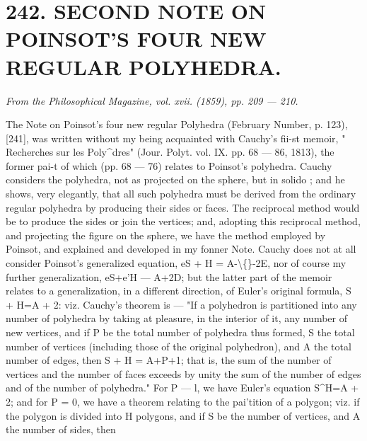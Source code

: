 \documentclass[11pt,a4paper]{book}
\begin{document}
\newpage

\section*{242. SECOND    NOTE    ON    POINSOT'S    FOUR   NEW    REGULAR POLYHEDRA.}
\begin{flushright}
\textit{From  the  Philosophical  Magazine,  vol.  xvii.  (1859),  pp.  209 — 210.}\n\end{flushright}
\vspace{0.5em}
The  Note  on  Poinsot's  four  new  regular  Polyhedra  (February  Number,  p.  123),
[241],  was  written  without  my  being  acquainted  with  Cauchy's  fii-st  memoir,  "  Recherches
sur  les  Poly^dres"  (Jour.  Polyt.  vol.  IX.  pp.  68 — 86,  1813),  the  former  pai-t  of  which
(pp.  68 — 76)  relates  to  Poinsot's  polyhedra.  Cauchy  considers  the  polyhedra,  not  as
projected  on  the  sphere,  but  in  solido ;  and  he  shows,  very  elegantly,  that  all  such
polyhedra  must  be  derived  from  the  ordinary  regular  polyhedra  by  producing  their
sides  or  faces.  The  reciprocal  method  would  be  to  produce  the  sides  or  join  the
vertices;  and,  adopting  this  reciprocal  method,  and  projecting  the  figure  on  the  sphere,
we  have  the  method  employed  by  Poinsot,  and  explained  and  developed  in  my  fonner
Note.  Cauchy  does  not  at  all  consider  Poinsot's  generalized  equation,  eS  +  H  =  A-\textbackslash\{\}-2E,
nor  of  course  my  further  generalization,  eS+e'H  —  A+2D;  but  the  latter  part  of  the
memoir  relates  to  a  generalization,  in  a  different  direction,  of  Euler's  original  formula,
S  +  H=A  +  2:  viz.  Cauchy's  theorem  is — "If  a  polyhedron  is  partitioned  into  any
number  of  polyhedra  by  taking  at  pleasure,  in  the  interior  of  it,  any  number  of  new
vertices,  and  if  P  be  the  total  number  of  polyhedra  thus  formed,  S  the  total  number
of  vertices  (including  those  of  the  original  polyhedron),  and  A  the  total  number  of
edges,  then  S  +  H  =  A+P+1;  that  is,  the  sum  of  the  number  of  vertices  and  the
number  of  faces  exceeds  by  unity  the  sum  of  the  number  of  edges  and  of  the  number
of  polyhedra."
For  P  —  l,  we  have  Euler's  equation  S^H=A  +  2;  and  for  P  =  0,  we  have  a
theorem  relating  to  the  pai'tition  of  a  polygon;  viz.  if  the  polygon  is  divided  into  H
polygons,  and  if  S  be  the  number  of  vertices,  and  A  the  number  of  sides,  then
\end{document}
